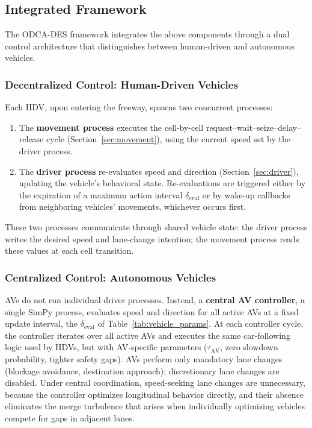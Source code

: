 \documentclass[review,authoryear]{elsarticle}
\begin{document}
\subsection{Integrated Framework}
\label{sec:integrated}

The ODCA-DES framework integrates the above components through a dual control architecture that distinguishes between human-driven and autonomous vehicles.

\subsubsection{Decentralized Control: Human-Driven Vehicles}

Each HDV, upon entering the freeway, spawns two concurrent processes:

\begin{enumerate}
    \item The \textbf{movement process} executes the cell-by-cell request--wait--seize--delay--release cycle (Section~\ref{sec:movement}), using the current speed set by the driver process.

    \item The \textbf{driver process} re-evaluates speed and direction (Section~\ref{sec:driver}), updating the vehicle's behavioral state. Re-evaluations are triggered either by the expiration of a maximum action interval $\delta_{\text{eval}}$ or by wake-up callbacks from neighboring vehicles' movements, whichever occurs first.
\end{enumerate}

These two processes communicate through shared vehicle state: the driver process writes the desired speed and lane-change intention; the movement process reads these values at each cell transition.

\subsubsection{Centralized Control: Autonomous Vehicles}
\label{sec:av_controller}

AVs do not run individual driver processes. Instead, a \textbf{central AV controller}, a single SimPy process, evaluates speed and direction for all active AVs at a fixed update interval, the $\delta_{\text{eval}}$ of Table~\ref{tab:vehicle_params}. At each controller cycle, the controller iterates over all active AVs and executes the same car-following logic used by HDVs, but with AV-specific parameters ($\tau_{\text{AV}}$, zero slowdown probability, tighter safety gaps). AVs perform only mandatory lane changes (blockage avoidance, destination approach); discretionary lane changes are disabled. Under central coordination, speed-seeking lane changes are unnecessary, because the controller optimizes longitudinal behavior directly, and their absence eliminates the merge turbulence that arises when individually optimizing vehicles compete for gaps in adjacent lanes.
\end{document}
